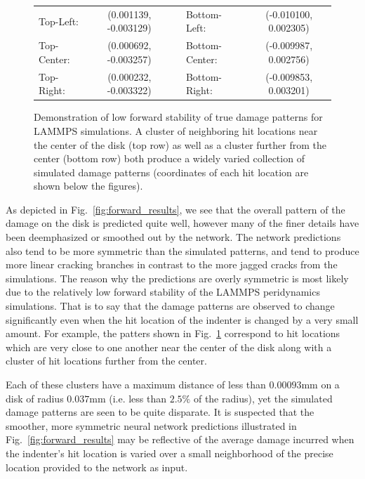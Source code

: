 \begin{figure}
  \begin{tabular}{lcclc}
  Top-Left:   &  (0.001139, -0.003129) & & Bottom-Left:   & (-0.010100, 0.002305) \\
  Top-Center: &  (0.000692, -0.003257) & & Bottom-Center: & (-0.009987, 0.002756) \\
  Top-Right:  &  (0.000232, -0.003322) & & Bottom-Right:  & (-0.009853, 0.003201) \\
  \end{tabular}
\caption{Demonstration of low forward stability of true damage patterns for LAMMPS simulations.  A cluster of neighboring hit locations near the center of the disk (top row) as well as a cluster further from the center (bottom row) both produce a widely varied collection of simulated damage patterns (coordinates of each hit location are shown below the figures).}
\label{fig:forward_solutions}       
\end{figure}


As depicted in Fig.~\ref{fig:forward_results}, we see that the overall pattern of the damage on the disk is predicted quite well, however many of the finer details have been deemphasized or smoothed out by the network.  The network predictions also tend to be more symmetric than the simulated patterns, and tend to produce more linear cracking branches in contrast to the more jagged cracks from the simulations.
%
The reason why the predictions are overly symmetric is most likely due to the relatively low forward stability of the LAMMPS peridynamics simulations.  That is to say that the damage patterns are observed to change significantly even when the hit location of the indenter is changed by a very small amount.  For example, the patters shown in Fig.~\ref{fig:forward_solutions} correspond to hit locations which are very close to one another near the center of the disk along with a cluster of hit locations further from the center.

Each of these clusters have a maximum distance of less than $0.00093$mm on a disk of radius $0.037$mm (i.e. less than $2.5\%$ of the radius), yet the simulated damage patterns are seen to be quite disparate.  It is suspected that the smoother, more symmetric neural network predictions illustrated in Fig.~\ref{fig:forward_results} may be reflective of the average damage incurred when the indenter's hit location is varied over a small neighborhood of the precise location provided to the network as input.






